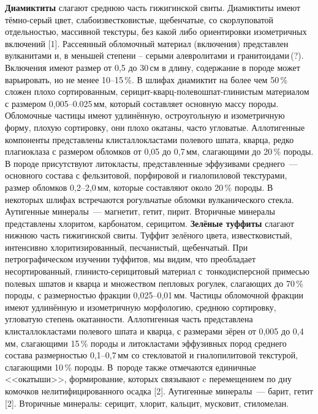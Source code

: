 \textbf{Диамиктиты} слагают среднюю часть гижигинской свиты. Диамиктиты имеют тёмно-серый цвет, слабоизвестковистые, щебенчатые, со скорлуповатой отдельностью, массивной текстуры, без какой либо ориентировки изометричных включений [1]. Рассеянный обломочный материал (включения) представлен вулканитами и, в меньшей степени – серыми алевролитами и гранитоидами\,(?). Включения имеют размер от 0,5 до 30\,см в длину, содержание в породе может варьировать, но не менее 10--15\,\%. В шлифах диамиктит на более чем 50\,\% сложен плохо сортированным, серицит-кварц-полевошпат-глинистым материалом с размером 0,005--0.025\,мм, который составляет основную массу породы. Обломочные частицы имеют удлинённую, остроугольную и изометричную форму, плохую сортировку, они плохо окатаны, часто угловатые. Аллотигенные компоненты представлены клисталлокластами полевого шпата, кварца, редко плагиоклаза с размером обломков от 0,05 до 0,7\,мм, слагающими до 20\,\% породы. В породе присутствуют литокласты, представленные эффузивами среднего~--- основного состава с фельзитовой, порфировой и гиалопиловой текстурами, размер обломков 0,2--2,0\,мм, которые составляют около 20\,\% породы. В некоторых шлифах  встречаются рогульчатые обломки вулканического стекла. Аутигенные минералы~--- магнетит, гетит, пирит. Вторичные минералы представлены хлоритом, карбонатом, серицитом.
\clearpage
\textbf{Зелёные туффиты} слагают нижнюю часть гижигинской свиты. Туффит зелёного цвета, известковистый, интенсивно хлоритизированный, песчанистый, щебенчатый. При петрографическом изучении туффитов, мы видим, что преобладает несортированный, глинисто-серицитовый материал с~тонкодисперсной примесью полевых шпатов и кварца и множеством пепловых рогулек, слагающих до 70\,\% породы, с размерностью фракции 0,025--0,01\,мм. Частицы обломочной фракции имеют удлинённую и изометричную морфологию, среднюю сортировку, угловатую степень окатанности. Аллотигенная часть представлена клисталлокластами полевого шпата и кварца, с размерами зёрен от 0,005 до 0,4\,мм, слагающими 15\,\% породы и литокластами эффузивных пород среднего состава размерностью 0,1--0,7\,мм со стекловатой и гиалопилитовой текстурой, слагающими 10\,\% породы. В~породе также отмечаются единичные <<окатыши>>, формирование, которых связывают c перемещением по дну комочков нелитифицированного осадка [2]. Аутигенные минералы~--- барит, гетит [2]. Вторичные минералы: серицит, хлорит, кальцит, мусковит, стиломелан.

